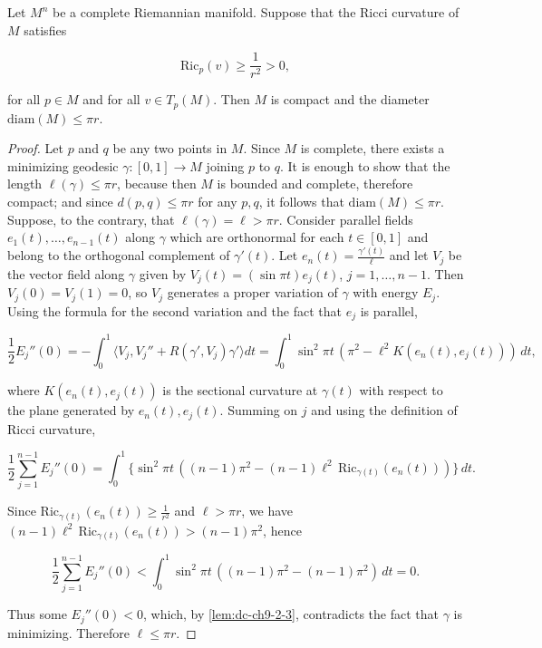 \begin{theorem}
  \label{thm:dc-ch9-3-1}


  Let $M^n$ be a complete Riemannian manifold. Suppose that the Ricci curvature of
  $M$ satisfies

  $$
  \mathrm{Ric}_p(v)\ge\frac{1}{r^2}>0,
  $$

  for all $p\in M$ and for all $v\in T_p(M)$. Then $M$ is compact and the diameter
  $\mathrm{diam}(M)\le\pi r$.
\end{theorem}
\begin{proof}
  \sketch
  Let $p$ and $q$ be any two points in $M$. Since $M$ is complete, there
  exists a minimizing geodesic $\gamma:[0,1]\to M$ joining $p$ to $q$. It is enough
  to show that the length $\ell(\gamma)\le\pi r$, because then $M$ is bounded and
  complete, therefore compact; and since $d(p,q)\le\pi r$ for any $p,q$, it follows
  that $\mathrm{diam}(M)\le\pi r$. Suppose, to the contrary, that
  $\ell(\gamma)=\ell>\pi r$. Consider parallel fields $e_1(t),\dots,e_{n-1}(t)$ along
  $\gamma$ which are orthonormal for each $t\in[0,1]$ and belong to the orthogonal
  complement of $\gamma'(t)$. Let $e_n(t)=\frac{\gamma'(t)}{\ell}$ and let $V_j$ be
  the vector field along $\gamma$ given by $V_j(t)=(\sin\pi t)e_j(t)$,
  $j=1,\dots,n-1$. Then $V_j(0)=V_j(1)=0$, so $V_j$ generates a proper variation of
  $\gamma$ with energy $E_j$. Using the formula for the second variation and the fact
  that $e_j$ is parallel,

  $$
  \frac{1}{2}E_j''(0)=-\int_0^1\langle V_j,V_j''+R(\gamma',V_j)\gamma'\rangle dt=\int_0^1\sin^2\pi t\,(\pi^2-\ell^2 K(e_n(t),e_j(t)))\,dt,
  $$

  where $K(e_n(t),e_j(t))$ is the sectional curvature at $\gamma(t)$ with respect to
  the plane generated by $e_n(t),e_j(t)$. Summing on $j$ and using the definition of
  Ricci curvature,

  $$
  \frac{1}{2}\sum_{j=1}^{n-1}E_j''(0)=\int_0^1\{\sin^2\pi t\,((n-1)\pi^2-(n-1)\ell^2\,\mathrm{Ric}_{\gamma(t)}(e_n(t)))\}\,dt.
  $$

  Since $\mathrm{Ric}_{\gamma(t)}(e_n(t))\ge\frac{1}{r^2}$ and $\ell>\pi r$, we have
  $(n-1)\ell^2\,\mathrm{Ric}_{\gamma(t)}(e_n(t))>(n-1)\pi^2$, hence

  $$
  \frac{1}{2}\sum_{j=1}^{n-1}E_j''(0)<\int_0^1\sin^2\pi t\,((n-1)\pi^2-(n-1)\pi^2)\,dt=0.
  $$

  Thus some $E_j''(0)<0$, which, by \cref{lem:dc-ch9-2-3},
  contradicts the fact that $\gamma$ is minimizing. Therefore $\ell\le\pi r$.
\end{proof}
